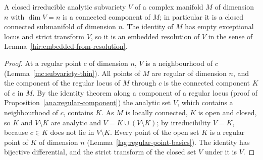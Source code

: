 \begin{lemma}
\label{mc:subvariety-full-dimension}
\leanok
A closed irreducible analytic subvariety \(V\) of a complex manifold \(M\) of dimension \(n\) with \(\dim V=n\) is a connected component of \(M\); in particular it is a
closed connected submanifold of dimension \(n\). The identity of \(M\) has empty exceptional locus and strict transform \(V\), so it is an embedded resolution
of \(V\) in the sense of Lemma~\ref{hir:embedded-from-resolution}.
\end{lemma}
\begin{proof}
\leanok
At a regular point \(c\) of dimension \(n\), \(V\) is a neighbourhood of \(c\) (Lemma~\ref{mc:subvariety-thin}). All points of \(M\) are regular of dimension \(n\), and the
component of the regular locus of \(M\) through \(c\) is the connected component \(K\) of \(c\) in \(M\). By the identity theorem along a component of a regular locus
(proof of Proposition~\ref{ana:regular-component}) the analytic set \(V\), which contains a neighbourhood of \(c\), contains \(K\). As \(M\) is locally connected, \(K\)
is open and closed, so \(K\) and \(V\setminus K\) are analytic and \(V=K\cup(V\setminus K)\); by irreducibility \(V=K\), because \(c\in K\) does not lie in
\(V\setminus K\). Every point of the open set \(K\) is a regular point of \(K\) of dimension \(n\) (Lemma~\ref{lag:regular-point-basics}). The identity has bijective
differential, and the strict transform of the closed set \(V\) under it is \(V\).
\end{proof}

